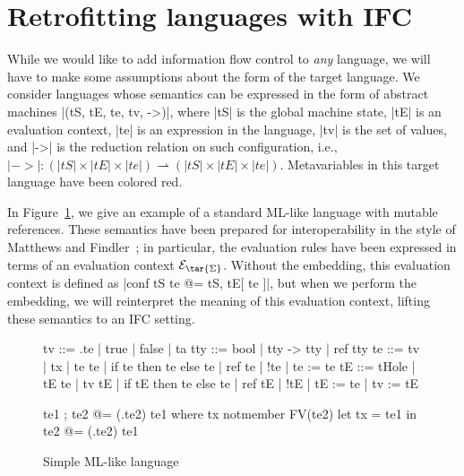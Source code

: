 \section{Retrofitting languages with IFC}
\label{sec:retrofit}

While we would like to add information flow control to \emph{any}
language, we will have to make some assumptions about the form of the
target language.  We consider languages whose semantics can be expressed
in the form of abstract machines |(tS, tE, te, tv, ->)|, where |tS| is the
global machine state, |tE| is an evaluation context, |te| is an
expression in the language, |tv| is the set of values, and |->| is the reduction relation on such
configuration, i.e., $|->| : (|tS| \times |tE| \times |te|)
\rightharpoonup (|tS| \times |tE| \times |te|)$.  Metavariables in this
target language have been colored red.

In Figure~\ref{fig:ml}, we give an example of a standard ML-like
language with mutable references.  These semantics have been prepared
for interoperability in the style of Matthews and Findler~; in
particular, the evaluation rules have been expressed in terms of an
evaluation context $\mathcal{E}_{\tar{\Sigma}}$.  Without the embedding,
this evaluation context is defined as |conf tS te @= tS, tE[ te ]|, but
when we perform the embedding, we will reinterpret the meaning
of this evaluation context, lifting these semantics to an IFC setting.

\begin{figure}
\begin{code}
tv   ::= \tx.te | true | false | ta
tty   ::= bool | tty -> tty | ref tty
te   ::= tv | tx | te te | if te then te else te | ref te | !te | te := te
tE   ::= tHole | tE te | tv tE | if tE then te else te
       | ref tE | !tE | tE := te | tv := tE 

te1 ; te2            @= (\tx.te2) te1  where  tx notmember FV(te2)
let tx = te1 in te2  @= (\tx.te2) te1
\end{code}



\caption{Simple ML-like language}
\label{fig:ml}
\end{figure}

